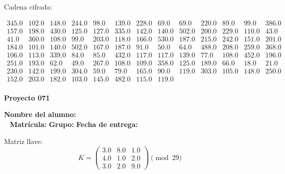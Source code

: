 \documentclass[12pt]{article}
\begin{document}
Cadena cifrada:
\begin{center}
$\begin{array}{lllllllllllll}
345.0 & 102.0 & 148.0 & 244.0 & 98.0 & 139.0 & 228.0 & 69.0 & 69.0 & 220.0 & 89.0 & 99.0 & 386.0\\
157.0 & 198.0 & 430.0 & 125.0 & 127.0 & 335.0 & 142.0 & 140.0 & 502.0 & 200.0 & 229.0 & 110.0 & 43.0\\
41.0 & 360.0 & 108.0 & 99.0 & 203.0 & 118.0 & 166.0 & 530.0 & 187.0 & 215.0 & 242.0 & 151.0 & 201.0\\
184.0 & 101.0 & 140.0 & 502.0 & 167.0 & 187.0 & 91.0 & 50.0 & 64.0 & 488.0 & 208.0 & 259.0 & 368.0\\
106.0 & 113.0 & 339.0 & 84.0 & 85.0 & 432.0 & 117.0 & 117.0 & 139.0 & 77.0 & 108.0 & 452.0 & 196.0\\
251.0 & 193.0 & 62.0 & 49.0 & 267.0 & 108.0 & 109.0 & 358.0 & 125.0 & 189.0 & 66.0 & 18.0 & 21.0\\
230.0 & 142.0 & 199.0 & 304.0 & 59.0 & 79.0 & 165.0 & 90.0 & 119.0 & 303.0 & 105.0 & 148.0 & 250.0\\
152.0 & 203.0 & 182.0 & 103.0 & 145.0 & 482.0 & 115.0 & 119.0\\
\end{array}$
\end{center}

\newpage


\textbf{Proyecto 071}

\textbf{Nombre del alumno:} \underline{\hspace{13cm}}\\\
\vspace{1cm}
\textbf{Matrícula:} \underline{\hspace{4cm}} \hspace{1cm}
\textbf{Grupo:} \underline{\hspace{2cm}}
\textbf{Fecha de entrega:} \underline{\hspace{2cm}}

\medskip

Matriz llave:
\[
K = \begin{pmatrix}
3.0 & 8.0 & 1.0\\
4.0 & 1.0 & 2.0\\
3.0 & 2.0 & 9.0
\end{pmatrix} \pmod{29}
\]
\end{document}
